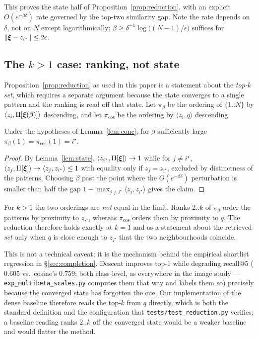 \noindent This proves the state half of Proposition~\ref{prop:reduction}, with an explicit
$O(e^{-\beta\delta})$ rate governed by the top-two similarity gap. Note the rate depends on
$\delta$, not on $N$ except logarithmically: $\beta \ge \delta^{-1}\log\!\big((N-1)/\epsilon\big)$
suffices for $\|\boldsymbol{\xi} - z_{i^\star}\|\le 2\epsilon$.

\subsection{The $k>1$ case: ranking, not state}

Proposition~\ref{prop:reduction} as used in this paper is a statement about the \emph{top-$k$
set}, which requires a separate argument because the state converges to a single pattern and
the ranking is read off that state. Let $\pi_\beta$ be the ordering of $\{1..N\}$ by
$\langle z_i, \Pi[\boldsymbol{\xi}(\beta)]\rangle$ descending, and let $\pi_{\cos}$ be the ordering by
$\langle z_i, q\rangle$ descending.

\begin{lemma}
\label{lem:rank1}
Under the hypotheses of Lemma~\ref{lem:conc}, for $\beta$ sufficiently large
$\pi_\beta(1) = \pi_{\cos}(1) = i^\star$.
\end{lemma}

\begin{proof}
By Lemma~\ref{lem:state}, $\langle z_{i^\star},\Pi[\boldsymbol{\xi}]\rangle \to 1$ while for $j\neq
i^\star$, $\langle z_j,\Pi[\boldsymbol{\xi}]\rangle \to \langle z_j, z_{i^\star}\rangle \le 1$ with
equality only if $z_j = z_{i^\star}$, excluded by distinctness of the patterns. Choosing
$\beta$ past the point where the $O(e^{-\beta\delta})$ perturbation is smaller than half the
gap $1-\max_{j\neq i^\star}\langle z_j,z_{i^\star}\rangle$ gives the claim.
\end{proof}

\begin{remark}
\label{rem:shortlist}
For $k>1$ the two orderings are \emph{not} equal in the limit. Ranks $2..k$ of $\pi_\beta$
order the patterns by proximity to $z_{i^\star}$, whereas $\pi_{\cos}$ orders them by
proximity to $q$. The reduction therefore holds exactly at $k=1$ and as a statement about the
retrieved \emph{set} only when $q$ is close enough to $z_{i^\star}$ that the two
neighbourhoods coincide.

This is not a technical caveat; it is the mechanism behind the empirical shortlist
regression in \S\ref{sec:completion}. Descent improves top-1 while degrading recall@5
($0.605$ vs.\ cosine's $0.759$; both class-level, as everywhere in the image study ---
\texttt{exp\_multibeta\_scales.py} computes them that way and labels them so) precisely
because the converged state has forgotten the cue.
Our implementation of the dense baseline therefore reads the top-$k$ from $q$ directly, which
is both the standard definition and the configuration that \texttt{tests/test\_reduction.py}
verifies; a baseline reading ranks $2..k$ off the converged state would be a weaker baseline
and would flatter the method.
\end{remark}


